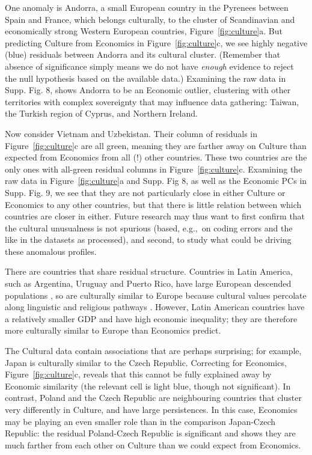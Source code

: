 \documentclass[a4]{article}
\newcommand{\+}[1]{\mathbf{#1}}
\begin{document}
One anomaly is Andorra, a small European country in the Pyrenees between Spain and France, which belongs culturally, to the cluster of Scandinavian and economically strong Western European countries, Figure~\ref{fig:culture}a. But predicting Culture from Economics in Figure~\ref{fig:culture}c, we see highly negative (blue) residuals between Andorra and its cultural cluster. (Remember that absence of significance simply means we do not have \emph{enough} evidence to reject the null hypothesis based on the available data.)  Examining the raw data in Supp. Fig. 8, shows Andorra to be an Economic outlier, clustering with other territories with complex sovereignty that may influence data gathering: Taiwan, the Turkish region of Cyprus, and Northern Ireland. %

Now consider Vietnam and Uzbekistan. Their column of residuals in Figure~\ref{fig:culture}c are all green, meaning they are farther away on Culture than expected from Economics from all (!) other countries. These two countries are the only ones with all-green residual columns in Figure~\ref{fig:culture}c. Examining the raw data in Figure~\ref{fig:culture}a and Supp. Fig 8, as well as the Economic PCs in Supp. Fig. 9, we see that they are not particularly close in either Culture or Economics to any other countries, but that there is little relation between which countries are closer in either. Future research may thus want to first confirm that the cultural unusualness is not spurious (based, e.g.,~on coding errors and the like in the datasets as processed), and second, to study what could be driving these anomalous profiles. 

There are countries that share residual structure. Countries in Latin America, such as Argentina, Uruguay and Puerto Rico, have large European descended populations \cite{CIA2018a, Putterman2010}, so are culturally similar to Europe because cultural values percolate along linguistic and religious pathways \cite{Matthews2013, Matthews2016a, Spolaore2013}. However, Latin American countries have a relatively smaller GDP and have high economic inequality; they are therefore more culturally similar to Europe than Economics predict.

The Cultural data contain associations that are perhaps surprising; for example, Japan is culturally similar to the Czech Republic. Correcting for Economics, Figure~\ref{fig:culture}c, reveals that this cannot be fully explained away by Economic similarity (the relevant cell is light blue, though not significant). In contrast, Poland and the Czech Republic are neighbouring countries that cluster very differently in Culture, and have large persistences. In this case, Economics may be playing an even smaller role than in the comparison Japan-Czech Republic: the residual Poland-Czech Republic is significant and shows they are much farther from each other on Culture than we could expect from Economics.  
\end{document}
